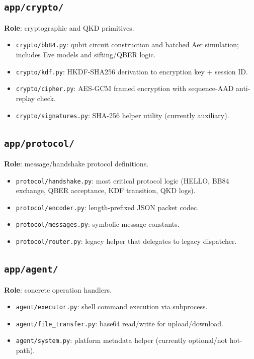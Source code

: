 \documentclass[11pt,a4paper]{article}
\begin{document}
\subsection{\texttt{app/crypto/}}
\textbf{Role}: cryptographic and QKD primitives.
\begin{itemize}[leftmargin=1.4em]
  \item \texttt{crypto/bb84.py}: qubit circuit construction and batched Aer simulation; includes Eve models and sifting/QBER logic.
  \item \texttt{crypto/kdf.py}: HKDF-SHA256 derivation to encryption key + session ID.
  \item \texttt{crypto/cipher.py}: AES-GCM framed encryption with sequence-AAD anti-replay check.
  \item \texttt{crypto/signatures.py}: SHA-256 helper utility (currently auxiliary).
\end{itemize}

\subsection{\texttt{app/protocol/}}
\textbf{Role}: message/handshake protocol definitions.
\begin{itemize}[leftmargin=1.4em]
  \item \texttt{protocol/handshake.py}: most critical protocol logic (HELLO, BB84 exchange, QBER acceptance, KDF transition, QKD logs).
  \item \texttt{protocol/encoder.py}: length-prefixed JSON packet codec.
  \item \texttt{protocol/messages.py}: symbolic message constants.
  \item \texttt{protocol/router.py}: legacy helper that delegates to legacy dispatcher.
\end{itemize}

\subsection{\texttt{app/agent/}}
\textbf{Role}: concrete operation handlers.
\begin{itemize}[leftmargin=1.4em]
  \item \texttt{agent/executor.py}: shell command execution via subprocess.
  \item \texttt{agent/file\_transfer.py}: base64 read/write for upload/download.
  \item \texttt{agent/system.py}: platform metadata helper (currently optional/not hot-path).
\end{itemize}
\end{document}
